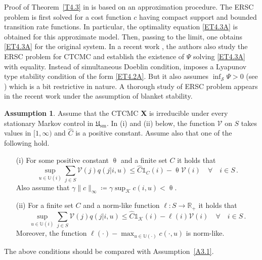 \documentclass[notitlepage,11pt,reqno]{amsart}
\numberwithin{equation}{section}
\theoremstyle{plain}
\theoremstyle{definition}
\newtheorem{assumption}{Assumption}[section]
\theoremstyle{remark}
\newcommand{\Ind}{\mathds{1}}       %
\newcommand{\Act}{{\mathds{U}}}
\newcommand{\sK}{{\mathscr{K}}}
\newcommand{\cK}{{\mathcal{K}}}
\newcommand{\cS}{{\mathcal{S}}}     %
\newcommand{\Lyap}{{\mathscr{V}}}   %
\newcommand{\Usm}{\mathfrak{U}_{\mathrm{sm}}}
\newcommand{\RR}{\mathds{R}} %
\newcommand{\norm}[1]{\lVert#1\rVert}
\newcommand{\df}{\coloneqq}
\begin{document}
Proof of Theorem~\ref{T4.3} in \cite{MR3937056} is based on an approximation procedure. The ERSC problem is first solved
for a cost function $c$ having compact support and bounded transition
rate functions. In particular, the optimality equation \eqref{ET4.3A}
is obtained for this approximate model. Then, passing to the limit,
one obtains \eqref{ET4.3A} for the original system. In a recent
work \cite{MR4276515}, the authors also study the ERSC problem for 
CTCMC and establish the existence of $\Psi$ solving \eqref{ET4.3A}
with equality. Instead of simultaneous Doeblin condition, 
\cite{MR4276515} imposes a Lyapunov type stability condition of
the form \eqref{ET4.2A}. But it also assumes  $\inf_{\cS}\Psi>0$ (see \cite[Assumption~5.1]{MR4276515}) 
which is a bit restrictive in nature. A thorough study of ERSC problem appears in the recent work \cite{MR4429406}
under the assumption of blanket stability.

\begin{assumption}\label{A4.4}
Assume that the CTCMC \textbf{X} is irreducible under every stationary Markov control in
$\Usm$. In (i) and (ii) below, the function $\Lyap$ on $S$ takes values in $[1, \infty)$ and
$\widehat{C}$ is a positive constant. Assume also that one of the following hold.
\begin{itemize}
\item[(i)] For some positive constant $\uptheta$ and a finite set $C$ it holds that 
\begin{equation*}
\sup_{u\in\Act(i)} \sum_{j\in S} \Lyap(j) q(j|i,u) \le  \widehat{C}\Ind_{C}(i) - \uptheta\Lyap(i) \quad \forall \quad i\in S\,. 
\end{equation*}
Also assume that $\gamma\norm{c}_\infty\df\gamma\sup_{\sK}c(i,u) < \uptheta$.
\item[(ii)] For a finite set $C$ and a norm-like function $\ell:S\to \RR_+$ it
holds that
\begin{equation*}
\sup_{u\in\Act(i)} \sum_{j\in S} \Lyap(j) q(j|i,u) \le \widehat{C} \Ind_{\cK}(i) - \ell(i)\Lyap(i) \quad \forall \quad i\in S\,. 
\end{equation*}
Moreover, the function $\ell(\cdot)-\max_{u\in\Act(\cdot)} c(\cdot, u)$ is norm-like.
\end{itemize}
\end{assumption}
The above conditions should be compared with Assumption~\ref{A3.1}.
\end{document}
